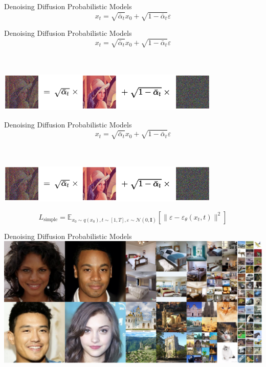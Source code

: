 \documentclass{beamer}
\begin{document}
\begin{frame}[t]{Denoising Diffusion Probabilistic Models \cite{ho2020denoising}}
    $$ x_t = \sqrt{\bar{\alpha}_t} x_0 + \sqrt{1 - \bar{\alpha}_t} \varepsilon $$
\end{frame}

\begin{frame}[t]{Denoising Diffusion Probabilistic Models \cite{ho2020denoising}}
    $$ x_t = \sqrt{\bar{\alpha}_t} x_0 + \sqrt{1 - \bar{\alpha}_t} \varepsilon $$ \\~\\
    \begin{center}
        \includegraphics[width=0.8\textwidth]{../images/2022-03-17-diffusion_models_files/reparam.png}
    \end{center}
\end{frame}

\begin{frame}[t]{Denoising Diffusion Probabilistic Models \cite{ho2020denoising}}
    $$ x_t = \sqrt{\bar{\alpha}_t} x_0 + \sqrt{1 - \bar{\alpha}_t} \varepsilon $$ \\~\\
    \begin{center}
        \includegraphics[width=0.8\textwidth]{../images/2022-03-17-diffusion_models_files/reparam.png}
    \end{center}

    $$ L_{\text{simple}} = \mathbb{E}_{x_0 \sim q(x_0), t\sim[1, T], \varepsilon \sim \mathcal{N}(0, \mathbf{I})} [\| \varepsilon - \varepsilon_\theta(x_t, t) \|^2] $$
\end{frame}

\begin{frame}{Denoising Diffusion Probabilistic Models \cite{ho2020denoising}}
    \includegraphics[width=\textwidth]{../images/2022-03-17-diffusion_models_files/ddpm_sample.png}
\end{frame}
\end{document}

